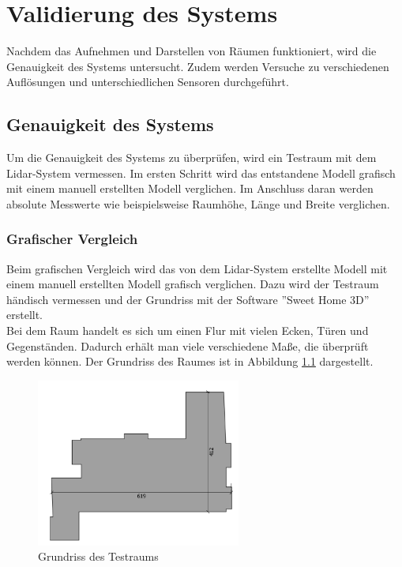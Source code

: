

\chapter{Validierung des Systems}\label{chap:validierung}

Nachdem das Aufnehmen und Darstellen von Räumen funktioniert, wird die Genauigkeit des Systems untersucht. Zudem werden Versuche zu verschiedenen Auflösungen und unterschiedlichen Sensoren durchgeführt.  


\section{Genauigkeit des Systems}

Um die Genauigkeit des Systems zu überprüfen, wird ein Testraum mit dem Lidar-System vermessen. Im ersten Schritt wird das entstandene Modell grafisch mit einem manuell erstellten Modell verglichen.
Im Anschluss daran werden absolute Messwerte wie beispielsweise Raumhöhe, Länge und Breite verglichen.

	
\subsection{Grafischer Vergleich}

Beim grafischen Vergleich wird das von dem Lidar-System erstellte Modell mit einem manuell erstellten Modell grafisch verglichen.
Dazu wird der Testraum händisch vermessen und der Grundriss mit der Software ''Sweet Home 3D'' erstellt. \\
Bei dem Raum handelt es sich um einen Flur mit vielen Ecken, Türen und Gegenständen. Dadurch erhält man viele verschiedene Maße, die überprüft werden können. Der Grundriss des Raumes ist in Abbildung \ref{grundriss} dargestellt. 

\begin{figure}[H]
	\centering
	\includegraphics[width=0.6\textwidth]{images/Validierung/Grundriss}
	\caption{Grundriss des Testraums}
	\label{grundriss}
\end{figure}


